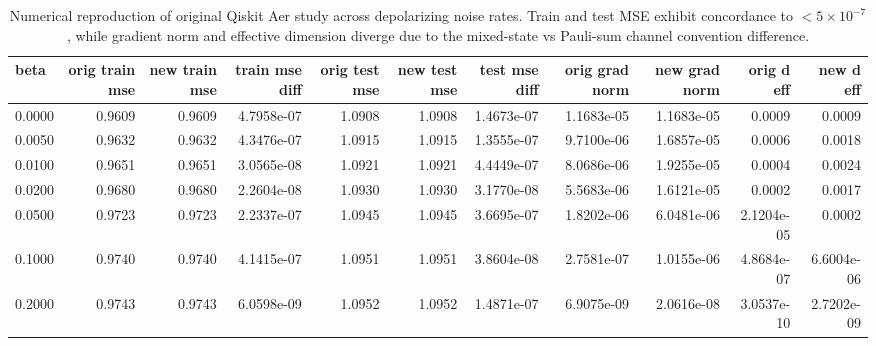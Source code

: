 \begin{table}[htbp]
\centering
\caption{Numerical reproduction of original Qiskit Aer study across depolarizing noise rates. Train and test MSE exhibit concordance to $<5\times 10^{-7}$, while gradient norm and effective dimension diverge due to the mixed-state vs Pauli-sum channel convention difference.}
\label{tab:reproduction_qiskit}
\begin{tabular}{lrrrrrrrrrr}
\toprule
\textbf{beta} & \textbf{orig train mse} & \textbf{new train mse} & \textbf{train mse diff} & \textbf{orig test mse} & \textbf{new test mse} & \textbf{test mse diff} & \textbf{orig grad norm} & \textbf{new grad norm} & \textbf{orig d eff} & \textbf{new d eff} \\
\midrule
0.0000 & 0.9609 & 0.9609 & 4.7958e-07 & 1.0908 & 1.0908 & 1.4673e-07 & 1.1683e-05 & 1.1683e-05 & 0.0009 & 0.0009 \\
0.0050 & 0.9632 & 0.9632 & 4.3476e-07 & 1.0915 & 1.0915 & 1.3555e-07 & 9.7100e-06 & 1.6857e-05 & 0.0006 & 0.0018 \\
0.0100 & 0.9651 & 0.9651 & 3.0565e-08 & 1.0921 & 1.0921 & 4.4449e-07 & 8.0686e-06 & 1.9255e-05 & 0.0004 & 0.0024 \\
0.0200 & 0.9680 & 0.9680 & 2.2604e-08 & 1.0930 & 1.0930 & 3.1770e-08 & 5.5683e-06 & 1.6121e-05 & 0.0002 & 0.0017 \\
0.0500 & 0.9723 & 0.9723 & 2.2337e-07 & 1.0945 & 1.0945 & 3.6695e-07 & 1.8202e-06 & 6.0481e-06 & 2.1204e-05 & 0.0002 \\
0.1000 & 0.9740 & 0.9740 & 4.1415e-07 & 1.0951 & 1.0951 & 3.8604e-08 & 2.7581e-07 & 1.0155e-06 & 4.8684e-07 & 6.6004e-06 \\
0.2000 & 0.9743 & 0.9743 & 6.0598e-09 & 1.0952 & 1.0952 & 1.4871e-07 & 6.9075e-09 & 2.0616e-08 & 3.0537e-10 & 2.7202e-09 \\
\bottomrule
\end{tabular}
\end{table}